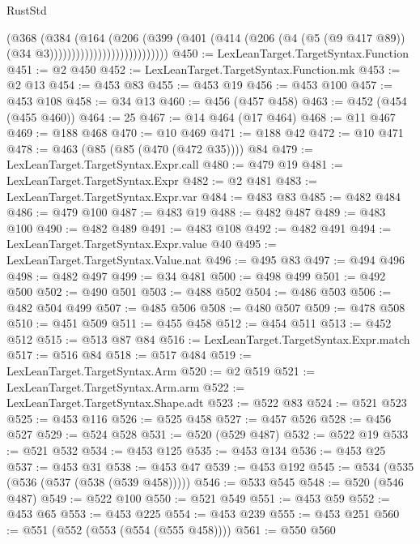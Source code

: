 \begin{lexlean}{RustStd}
\begin{coremodule}
{\begin{coremodule}
{{{{{{{{{{                                      (@368
                                        (@384
                                          (@164
                                            (@206
                                              (@399
                                                (@401
                                                  (@414
                                                    (@206
                                                      (@4
                                                        (@5 (@9 @417 @89))
                                                        (@34 @3)))))))))))))))))))))))))))
@450 := LexLeanTarget.TargetSyntax.Function
@451 := @2 @450
@452 := LexLeanTarget.TargetSyntax.Function.mk
@453 := @2 @13
@454 := @453 @83
@455 := @453 @19
@456 := @453 @100
@457 := @453 @108
@458 := @34 @13
@460 := @456 (@457 @458)
@463 := @452 (@454 (@455 @460))
@464 := 25
@467 := @14 @464 (@17 @464)
@468 := @11 @467
@469 := @188 @468
@470 := @10 @469
@471 := @188 @42
@472 := @10 @471
@478 := @463 (@85 (@85 (@470 (@472 @35)))) @84
@479 := LexLeanTarget.TargetSyntax.Expr.call
@480 := @479 @19
@481 := LexLeanTarget.TargetSyntax.Expr
@482 := @2 @481
@483 := LexLeanTarget.TargetSyntax.Expr.var
@484 := @483 @83
@485 := @482 @484
@486 := @479 @100
@487 := @483 @19
@488 := @482 @487
@489 := @483 @100
@490 := @482 @489
@491 := @483 @108
@492 := @482 @491
@494 := LexLeanTarget.TargetSyntax.Expr.value @40
@495 := LexLeanTarget.TargetSyntax.Value.nat
@496 := @495 @83
@497 := @494 @496
@498 := @482 @497
@499 := @34 @481
@500 := @498 @499
@501 := @492 @500
@502 := @490 @501
@503 := @488 @502
@504 := @486 @503
@506 := @482 @504 @499
@507 := @485 @506
@508 := @480 @507
@509 := @478 @508
@510 := @451 @509
@511 := @455 @458
@512 := @454 @511
@513 := @452 @512
@515 := @513 @87 @84
@516 := LexLeanTarget.TargetSyntax.Expr.match
@517 := @516 @84
@518 := @517 @484
@519 := LexLeanTarget.TargetSyntax.Arm
@520 := @2 @519
@521 := LexLeanTarget.TargetSyntax.Arm.arm
@522 := LexLeanTarget.TargetSyntax.Shape.adt
@523 := @522 @83
@524 := @521 @523
@525 := @453 @116
@526 := @525 @458
@527 := @457 @526
@528 := @456 @527
@529 := @524 @528
@531 := @520 (@529 @487)
@532 := @522 @19
@533 := @521 @532
@534 := @453 @125
@535 := @453 @134
@536 := @453 @25
@537 := @453 @31
@538 := @453 @47
@539 := @453 @192
@545 := @534 (@535 (@536 (@537 (@538 (@539 @458)))))
@546 := @533 @545
@548 := @520 (@546 @487)
@549 := @522 @100
@550 := @521 @549
@551 := @453 @59
@552 := @453 @65
@553 := @453 @225
@554 := @453 @239
@555 := @453 @251
@560 := @551 (@552 (@553 (@554 (@555 @458))))
@561 := @550 @560
}}}}}}}}}}
\end{coremodule}}
\end{coremodule}
\end{lexlean}
